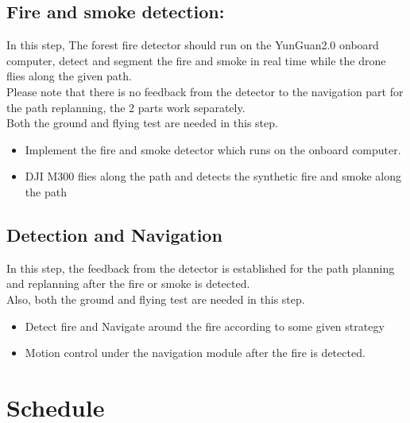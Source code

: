 \documentclass{report}
\begin{document}
\section{Fire and smoke detection:}
In this step, The forest fire detector should run on the YunGuan2.0 onboard
computer, detect and segment the fire and smoke in real time while the drone
flies along the given path.
\\
Please note that there is no feedback from the detector to the navigation part
for the path replanning, the 2 parts work separately.
\\
Both the ground and flying test are needed in this step.

\begin{itemize}
    \item Implement the fire and smoke detector which runs on the 
        onboard computer.
    \item DJI M300 flies along the path and detects the synthetic fire
        and smoke along the path
\end{itemize}

\section{Detection and Navigation}

In this step, the feedback from the detector is established for the path
planning and replanning after the fire or smoke is detected.
\\
Also, both the ground and flying test are needed in this step.

\begin{itemize}
    \item Detect fire and  Navigate around the fire according to some 
        given strategy
    \item Motion control under the navigation module after the fire is 
        detected.
\end{itemize}


\chapter{Schedule}
\end{document}
